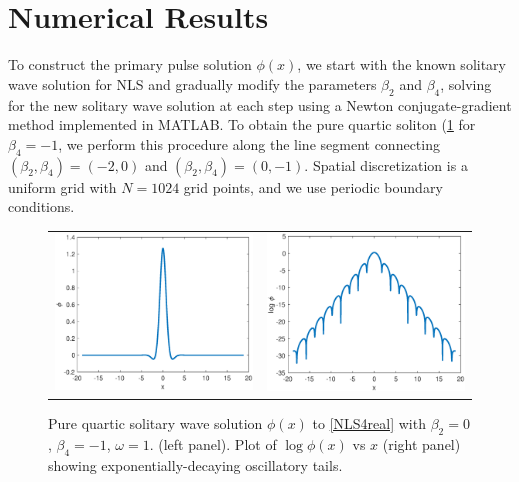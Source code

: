 \documentclass[12pt]{article}
\begin{document}
\section{Numerical Results}

To construct the primary pulse solution $\phi(x)$, we start with the known solitary wave solution for NLS and gradually modify the parameters $\beta_2$ and $\beta_4$, solving for the new solitary wave solution at each step using a Newton conjugate-gradient method \cite[Chapter 7.2.4]{YangCh7} implemented in MATLAB. To obtain the pure quartic soliton (\cref{fig:PQS} for $\beta_4 = -1$, we perform this procedure along the line segment connecting $(\beta_2, \beta_4) = (-2, 0)$ and $(\beta_2, \beta_4) = (0, -1)$. Spatial discretization is a uniform grid with $N = 1024$ grid points, and we use periodic boundary conditions.

\begin{figure}[H]
\centering
\begin{tabular}{cc}
\includegraphics[width=8cm]{images/PQS1.eps} &
\includegraphics[width=8cm]{images/PQS1log.eps}
\end{tabular}
\caption{Pure quartic solitary wave solution $\phi(x)$ to \cref{NLS4real} with $\beta_2 = 0$, $\beta_4 = -1$, $\omega = 1$. (left panel). Plot of $\log \phi(x)$ vs $x$ (right panel) showing exponentially-decaying oscillatory tails. }
\label{fig:PQS}
\end{figure} 
\end{document}
